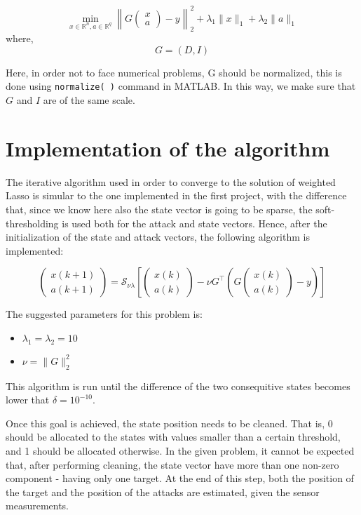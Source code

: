 \begin{equation}
\min_{x \in \mathbb{R}^{n}, a \in \mathbb{R}^{q}} \left\| G \begin{pmatrix} x \\ a \end{pmatrix} - y \right\|_2^2 + \lambda_1 \| x \|_1 + \lambda_2 \| a \|_1
\end{equation}
where,
\[
G = (D, I)
\]

Here, in order not to face numerical problems, G should be normalized, this is done using \texttt{normalize( )} command in MATLAB. In this way, we make sure that $G$ and $I$ are of the same scale.

\section{Implementation of the algorithm}
The iterative algorithm used in order to converge to the solution of weighted Lasso is simular to the one implemented in the first project, with the difference that, since we know here also the state vector is going to be sparse, the soft-thresholding is used both for the attack and state vectors. Hence, after the initialization of the state and attack vectors, the following algorithm is implemented:

\begin{equation}
\begin{pmatrix}
x(k+1) \\
a(k+1)
\end{pmatrix}
=
\mathcal{S}_{\nu \lambda} \left[
\begin{pmatrix}
x(k) \\
a(k)
\end{pmatrix}
- \nu G^\top \left(
G \begin{pmatrix}
x(k) \\
a(k)
\end{pmatrix}
- y
\right)
\right]
\end{equation}

The suggested parameters for this problem is:
\begin{itemize}
	\item $\lambda_1 = \lambda_2 = 10$
	\item $\nu = \|G\|_2^2$
\end{itemize}

This algorithm is run until the difference of the two consequitive states becomes lower that $\delta = 10^{-10}$.

Once this goal is achieved, the state position needs to be cleaned. That is, 0 should be allocated to the states with values smaller than a certain threshold, and 1 should be allocated otherwise. In the given problem, it cannot be expected that, after performing cleaning, the state vector have more than one non-zero component - having only one target. At the end of  this step, both the position of the target and the position of the attacks are estimated, given the sensor measurements.

